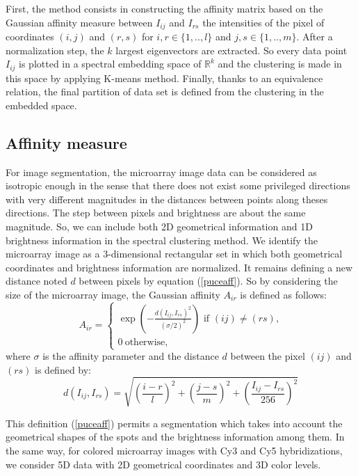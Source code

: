 \documentclass[runningheads,a4paper]{llncs}
\begin{document}
First, the method  consists in constructing the affinity matrix based on the
Gaussian affinity measure between $I_{ij}$ and $I_{rs}$ the intensities of the
pixel of coordinates $(i,j)$ and $(r,s)$ for $i,r\in \{1,..,l\}$ and $j,s\in
\{1,..,m\}$. After a normalization step, the $k$ largest eigenvectors are
extracted. So every data point $I_{ij}$ is plotted in a spectral embedding
space of $\mathbb{R}^k$ and the clustering is made in this space by applying
K-means method. Finally, thanks to an equivalence relation, the final
partition of  data set is defined from the clustering in the embedded space.

\subsection{Affinity measure}

For image segmentation, the microarray image data can be considered as
isotropic enough in the sense that there does not exist some privileged
directions with very different magnitudes in the distances between points
along theses directions.  The step between pixels and brightness are about the
same magnitude. So, we can include both 2D geometrical information and 1D
brightness information in the spectral clustering method. We identify the
microarray image as a 3-dimensional rectangular set in which both geometrical
coordinates and brightness information are normalized. It remains defining a
new distance noted $d$ between pixels by equation (\ref{puceaff}).
So by considering the size of the microarray image, the Gaussian affinity
$A_{ir}$ is defined as follows:
\begin{equation}
A_{ir}=\begin{cases}
\exp\left(-\frac{d\left(I_{ij},I_{rs}\right)^2}{(\sigma/2)^2}\right) \text{\  if $(ij)\neq (rs)$,}\\ \label{defaff}
0 \ \text{otherwise,} 
\end{cases}
\end{equation}
where $\sigma$ is the affinity parameter and  the distance $d$ between the pixel $(ij)$ and $(rs)$ is defined by:
\begin{equation}
d\left(I_{ij},I_{rs}\right)=\sqrt{\left(\frac{i-r}{l}\right)^2+\left(\frac{j-s}{m}\right)^2+\left(\frac{I_{ij}-I_{rs}}{256}\right)^2}
\label{puceaff}
\end{equation}


This definition (\ref{puceaff}) permits a segmentation which takes into
account the geometrical shapes of the spots and the brightness information
among them. In the same way, for colored microarray images with  Cy3 and Cy5
hybridizations, we consider 5D data with 2D geometrical coordinates and 3D color
levels.
\end{document}
